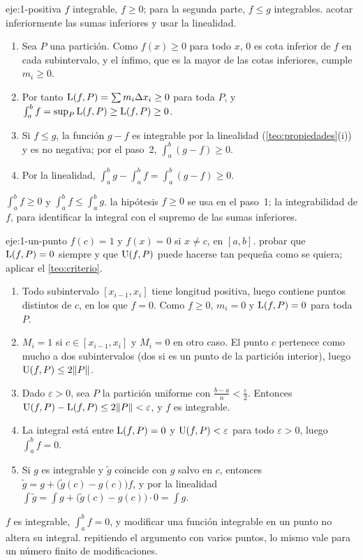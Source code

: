 \begin{solucion}{eje:1-positiva}
\datos $f$ integrable, $f\ge0$; para la segunda parte, $f\le g$ integrables.
\planteamiento acotar inferiormente las sumas inferiores y usar la linealidad.
\pasos
\begin{enumerate}[label=\arabic*.]
  \item Sea $P$ una partición. Como $f(x)\ge0$ para todo $x$, $0$ es cota inferior de $f$ en cada subintervalo, y el ínfimo, que es la mayor de las cotas inferiores, cumple $m_i\ge0$.
  \item Por tanto $\operatorname{L}(f,P)=\sum m_i\Delta x_i\ge0$ para toda $P$, y $\int_a^bf=\sup_P\operatorname{L}(f,P)\ge\operatorname{L}(f,P)\ge0$.
  \item Si $f\le g$, la función $g-f$ es integrable por la linealidad (\cref{teo:propiedades}(i)) y es no negativa; por el paso~2, $\int_a^b(g-f)\ge0$.
  \item Por la linealidad, $\int_a^bg-\int_a^bf=\int_a^b(g-f)\ge0$.
\end{enumerate}
\resultado $\int_a^bf\ge0$ y $\int_a^bf\le\int_a^bg$.
\comprobacion la hipótesis $f\ge0$ se usa en el paso~1; la integrabilidad de $f$, para identificar la integral con el supremo de las sumas inferiores.
\end{solucion}

\begin{solucion}{eje:1-un-punto}
\datos $f(c)=1$ y $f(x)=0$ si $x\neq c$, en $[a,b]$.
\planteamiento probar que $\operatorname{L}(f,P)=0$ siempre y que $\operatorname{U}(f,P)$ puede hacerse tan pequeña como se quiera; aplicar el \cref{teo:criterio}.
\pasos
\begin{enumerate}[label=\arabic*.]
  \item Todo subintervalo $[x_{i-1},x_i]$ tiene longitud positiva, luego contiene puntos distintos de $c$, en los que $f=0$. Como $f\ge0$, $m_i=0$ y $\operatorname{L}(f,P)=0$ para toda $P$.
  \item $M_i=1$ si $c\in[x_{i-1},x_i]$ y $M_i=0$ en otro caso. El punto $c$ pertenece como mucho a dos subintervalos (dos si es un punto de la partición interior), luego $\operatorname{U}(f,P)\le2\lVert P\rVert$.
  \item Dado $\varepsilon>0$, sea $P$ la partición uniforme con $\frac{b-a}{n}<\frac\varepsilon2$. Entonces $\operatorname{U}(f,P)-\operatorname{L}(f,P)\le2\lVert P\rVert<\varepsilon$, y $f$ es integrable.
  \item La integral está entre $\operatorname{L}(f,P)=0$ y $\operatorname{U}(f,P)<\varepsilon$ para todo $\varepsilon>0$, luego $\int_a^bf=0$.
  \item Si $g$ es integrable y $\tilde g$ coincide con $g$ salvo en $c$, entonces $\tilde g=g+\bigl(\tilde g(c)-g(c)\bigr)f$, y por la linealidad $\int\tilde g=\int g+\bigl(\tilde g(c)-g(c)\bigr)\cdot0=\int g$.
\end{enumerate}
\resultado $f$ es integrable, $\int_a^bf=0$, y modificar una función integrable en un punto no altera su integral.
\comprobacion repitiendo el argumento con varios puntos, lo mismo vale para un número finito de modificaciones.
\end{solucion}

